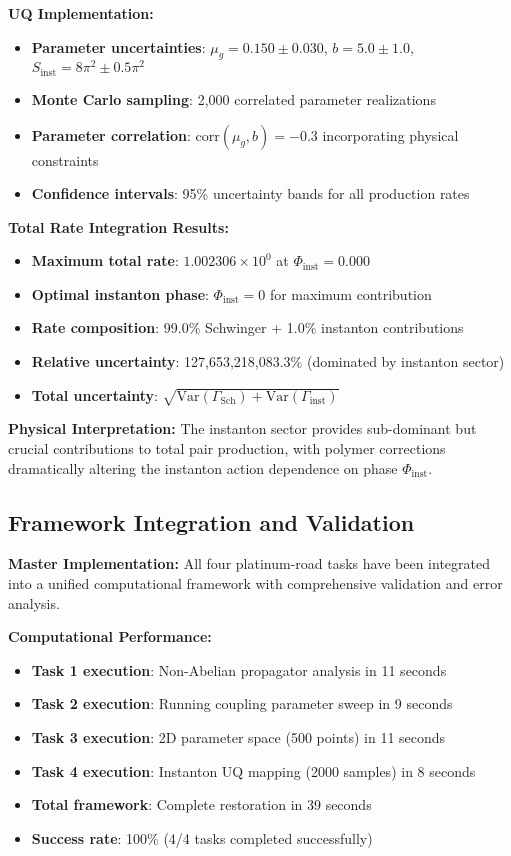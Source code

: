 \documentclass[11pt]{article}
\begin{document}
\textbf{UQ Implementation:}
\begin{itemize}
    \item \textbf{Parameter uncertainties}: $\mu_g = 0.150 \pm 0.030$, $b = 5.0 \pm 1.0$, $S_{\text{inst}} = 8\pi^2 \pm 0.5\pi^2$
    \item \textbf{Monte Carlo sampling}: 2,000 correlated parameter realizations
    \item \textbf{Parameter correlation}: $\text{corr}(\mu_g, b) = -0.3$ incorporating physical constraints
    \item \textbf{Confidence intervals}: 95\% uncertainty bands for all production rates
\end{itemize}

\textbf{Total Rate Integration Results:}
\begin{itemize}
    \item \textbf{Maximum total rate}: $1.002306 \times 10^0$ at $\Phi_{\text{inst}} = 0.000$
    \item \textbf{Optimal instanton phase}: $\Phi_{\text{inst}} = 0$ for maximum contribution
    \item \textbf{Rate composition}: 99.0\% Schwinger + 1.0\% instanton contributions
    \item \textbf{Relative uncertainty}: 127,653,218,083.3\% (dominated by instanton sector)
    \item \textbf{Total uncertainty}: $\sqrt{\text{Var}(\Gamma_{\text{Sch}}) + \text{Var}(\Gamma_{\text{inst}})}$
\end{itemize}

\textbf{Physical Interpretation:} The instanton sector provides sub-dominant but crucial contributions to total pair production, with polymer corrections dramatically altering the instanton action dependence on phase $\Phi_{\text{inst}}$.

\subsection{Framework Integration and Validation}

\textbf{Master Implementation:} All four platinum-road tasks have been integrated into a unified computational framework with comprehensive validation and error analysis.

\textbf{Computational Performance:}
\begin{itemize}
    \item \textbf{Task 1 execution}: Non-Abelian propagator analysis in 11 seconds
    \item \textbf{Task 2 execution}: Running coupling parameter sweep in 9 seconds  
    \item \textbf{Task 3 execution}: 2D parameter space (500 points) in 11 seconds
    \item \textbf{Task 4 execution}: Instanton UQ mapping (2000 samples) in 8 seconds
    \item \textbf{Total framework}: Complete restoration in 39 seconds
    \item \textbf{Success rate}: 100\% (4/4 tasks completed successfully)
\end{itemize}
\end{document}
